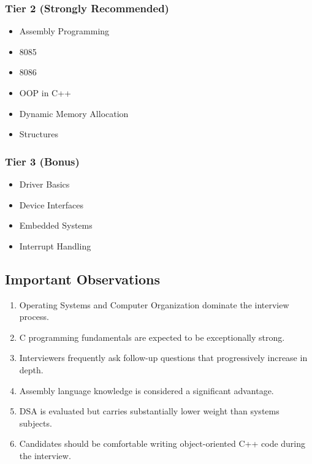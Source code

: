 \documentclass[11pt,a4paper]{article}
\begin{document}
\subsubsection{Tier 2 (Strongly Recommended)}

\begin{itemize}
	\item Assembly Programming
	\item 8085
	\item 8086
	\item OOP in C++
	\item Dynamic Memory Allocation
	\item Structures
\end{itemize}

\subsubsection{Tier 3 (Bonus)}

\begin{itemize}
	\item Driver Basics
	\item Device Interfaces
	\item Embedded Systems
	\item Interrupt Handling
\end{itemize}


\subsection{Important Observations}

\begin{enumerate}
	\item Operating Systems and Computer Organization dominate the interview process.
	\item C programming fundamentals are expected to be exceptionally strong.
	\item Interviewers frequently ask follow-up questions that progressively increase in depth.
	\item Assembly language knowledge is considered a significant advantage.
	\item DSA is evaluated but carries substantially lower weight than systems subjects.
	\item Candidates should be comfortable writing object-oriented C++ code during the interview.
\end{enumerate}
\end{document}
